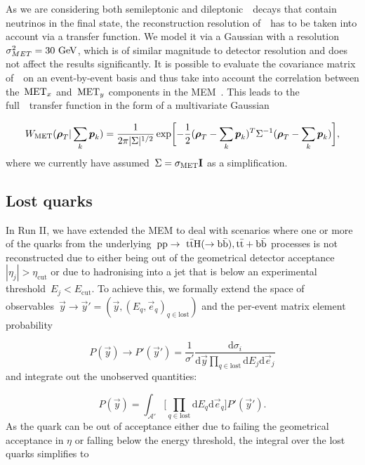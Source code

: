 As we are considering both semileptonic and dileptonic~\ttH~decays that contain neutrinos in the final state, the reconstruction resolution of~\MET~has to be taken into account via a transfer function. We model it via a Gaussian with a resolution~$\sigma_{MET}^2 = 30~\mathrm{GeV}$, which is of similar magnitude to detector resolution and does not affect the results significantly.
It is possible to evaluate the covariance matrix of~\MET~on an event-by-event basis and thus take into account the correlation between the~$\mathrm{MET}_x$ and~$\mathrm{MET}_y$ components in the MEM~\cite{2011JInst...6.9001C}. This leads to the full~\MET~transfer function in the form of a  multivariate Gaussian

\begin{equation}
W_{\mathrm{MET}}(\boldsymbol{\rho}_T | \sum_k \boldsymbol{p}_k) = \frac{1}{2\pi |\Sigma|^{1/2}} \exp \biggl[ -\frac{1}{2} (\boldsymbol{\rho}_T - \sum_k \boldsymbol{p}_k)^T \Sigma^{-1} (\boldsymbol{\rho}_T - \sum_k \boldsymbol{p}_k)\biggr],
\end{equation}
where we currently have assumed~$\Sigma = \sigma_{\mathrm{MET}} \mathbf{I}$ as a simplification.

\subsection{Lost quarks}
\label{sec:lost_quarks}

In Run II, we have extended the MEM to deal with scenarios where one or more of the quarks from the underlying~$\mathrm{pp} \rightarrow~\mathrm{t} \bar{\mathrm{t}} \mathrm{H}(\rightarrow \mathrm{b}\bar{\mathrm{b}}),\mathrm{t} \bar{\mathrm{t}} + \mathrm{b}\bar{\mathrm{b}}$ processes is not reconstructed due to either being out of the geometrical detector acceptance~$|\eta_j| > \eta_{\mathrm{cut}}$ or due to hadronising into a jet that is below an experimental threshold~$E_j < E_{\mathrm{cut}}$.
To achieve this, we formally extend the space of observables~$\vec{y} \rightarrow \vec{y}' = (\vec{y}, (E_q, \vec{e}_q)_{q \in \mathrm{lost}})$ and the per-event matrix element probability

\begin{equation}
P(\vec{y}) \rightarrow P'(\vec{y}') = \frac{1}{\sigma'} \frac{\mathrm{d} \sigma_i}{\mathrm{d}\vec{y} \prod_{q\in\mathrm{lost}} \mathrm{d}E_j \mathrm{d}\vec{e}_j}
\end{equation}
and integrate out the unobserved quantities:

\begin{equation}
P(\vec{y}) = \int_{\mathcal{A}'} \bigl[ \prod_{q \in \mathrm{lost}} \mathrm{d}E_q \mathrm{d}\vec{e}_q \bigr] P'(\vec{y}').
\end{equation}
As the quark can be out of acceptance either due to failing the geometrical acceptance in $\eta$ or falling below the energy threshold, the integral over the lost quarks simplifies to

